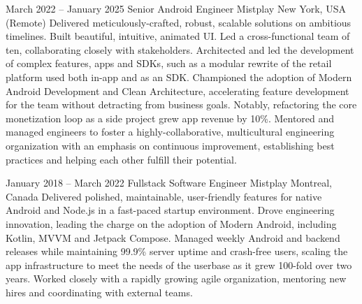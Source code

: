 \documentclass[10pt,a4paper,sans]{moderncv} %
\newcommand{\vs}[0]{\smallskip}
\begin{document}
\cventry
{March 2022 -- January 2025}
{Senior Android Engineer}
{{Mistplay}}
{New York, USA (Remote)}
{}{
	Delivered meticulously-crafted, robust, scalable solutions on ambitious timelines. Built beautiful, intuitive, animated UI.
	Led a cross-functional team of ten, collaborating closely with stakeholders.
	Architected and led the development of complex features, apps and SDKs, such as a modular rewrite of the retail platform used both in-app and as an SDK.
	Championed the adoption of Modern Android Development and Clean Architecture, accelerating feature development for the team without detracting from business goals. Notably, refactoring the core monetization loop as a side project grew app revenue by 10\%.
	Mentored and managed engineers to foster a highly-collaborative, multicultural engineering organization with an emphasis on continuous improvement, establishing best practices and helping each other fulfill their potential.
}\vs

\cventry
{January 2018 -- March 2022}
{Fullstack Software Engineer}
{{Mistplay}}
{Montreal, Canada}
{}
{
	Delivered polished, maintainable, user-friendly features for native Android and Node.js in a fast-paced startup environment.
	Drove engineering innovation, leading the charge on the adoption of Modern Android, including Kotlin, MVVM and Jetpack Compose.
	Managed weekly Android and backend releases while maintaining 99.9\% server uptime and crash-free users, scaling the app infrastructure to meet the needs of the userbase as it grew 100-fold over two years.
	Worked closely with a rapidly growing agile organization, mentoring new hires and coordinating with external teams.
}\vs

\vs


\end{document}
